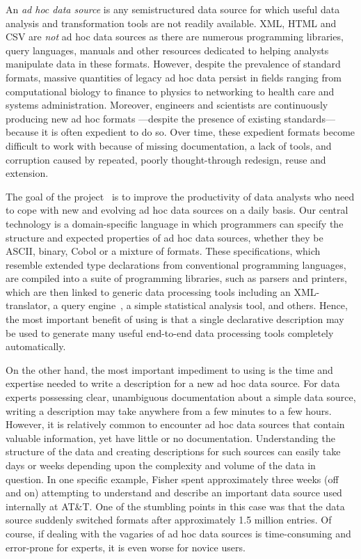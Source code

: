 
An {\em ad hoc data source} is any semistructured data source
for which useful data analysis and transformation tools
are not readily available. XML, HTML and CSV are {\em not} 
ad hoc data sources as there are numerous programming libraries,
query languages, manuals and other resources dedicated to
helping analysts manipulate data in these formats.
However, despite the prevalence of standard formats,
massive quantities of legacy ad hoc data persist in fields ranging from
computational biology to finance to physics to networking to health care and
systems administration.  Moreover, engineers and scientists are continuously
producing new ad hoc formats ---despite the presence of existing 
standards--- because it is often expedient to do so.  Over time, these
expedient formats become difficult to work with because of missing
documentation, a lack of tools, and corruption caused by repeated,
poorly thought-through redesign, reuse and extension.

The goal of the \pads{}
project~\cite{fisher+:pads,fisher+:popl06,mandelbaum+:pads-ml,padsweb}
is to improve the productivity of data analysts who need to cope with
new and evolving ad hoc data sources on a daily basis.  Our central
technology is a domain-specific language in which programmers can
specify the structure and expected properties of ad hoc data sources,
whether they be ASCII, binary, Cobol or a mixture of formats.  These
specifications, which resemble extended type declarations from
conventional programming languages, are compiled into a suite of
programming libraries, such as parsers and printers, which are then
linked to generic 
data processing tools including an XML-translator, a query
engine~\cite{fernandez+:padx}, a 
simple statistical analysis tool, and others.  Hence, the most important
benefit of using \pads{} is that  a single declarative description
may be used to generate many useful end-to-end data processing tools completely
automatically.

On the other hand, the most important impediment to using \pads{}
is the time and expertise needed
to write a \pads{} description for a new ad hoc data source.
For data experts possessing clear, unambiguous documentation about a
simple data source, writing a \pads{} description may take 
anywhere from a few minutes to a few hours.  However,
it is relatively common to encounter ad hoc data sources that 
contain valuable information, yet have little or no documentation.
Understanding the structure of the data and creating descriptions for such 
sources can easily take days or weeks depending upon the complexity
and volume of the data in question.  In one specific example, Fisher
spent approximately three weeks (off and on) attempting to understand
and describe an important data source used internally at AT\&T.  One
of the stumbling points in this case was that the data source suddenly 
switched formats after approximately 1.5 million entries.  Of course,
if dealing with the vagaries of ad hoc data sources is
time-consuming and error-prone for experts, it is even worse for
novice users.

